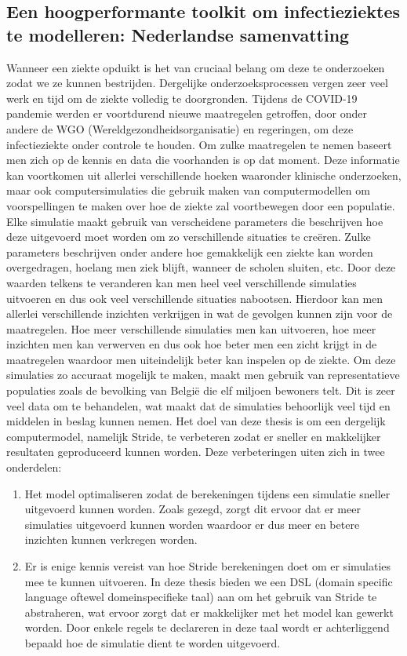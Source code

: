 \begin{appendices}
\chapter{Een hoogperformante toolkit om infectieziektes te modelleren: Nederlandse samenvatting}
Wanneer een ziekte opduikt is het van cruciaal belang om deze te onderzoeken zodat we ze kunnen bestrijden. Dergelijke onderzoeksprocessen vergen zeer veel werk en tijd om de ziekte volledig te doorgronden. Tijdens de COVID-19 pandemie werden er voortdurend nieuwe maatregelen getroffen, door onder andere de WGO (Wereldgezondheidsorganisatie) en regeringen, om deze infectieziekte onder controle te houden. Om zulke maatregelen te nemen baseert men zich op de kennis en data die voorhanden is op dat moment. Deze informatie kan voortkomen uit allerlei verschillende hoeken waaronder klinische onderzoeken, maar ook computersimulaties die gebruik maken van computermodellen om voorspellingen te maken over hoe de ziekte zal voortbewegen door een populatie. Elke simulatie maakt gebruik van verscheidene parameters die beschrijven hoe deze uitgevoerd moet worden om zo verschillende situaties te creëren. Zulke parameters beschrijven onder andere hoe gemakkelijk een ziekte kan worden overgedragen, hoelang men ziek blijft, wanneer de scholen sluiten, etc. Door deze waarden telkens te veranderen kan men heel veel verschillende simulaties uitvoeren en dus ook veel verschillende situaties nabootsen. Hierdoor kan men allerlei verschillende inzichten verkrijgen in wat de gevolgen kunnen zijn voor de maatregelen. Hoe meer verschillende simulaties men kan uitvoeren, hoe meer inzichten men kan verwerven en dus ook hoe beter men een zicht krijgt in de maatregelen waardoor men uiteindelijk beter kan inspelen op de ziekte. Om deze simulaties zo accuraat mogelijk te maken, maakt men gebruik van representatieve populaties zoals de bevolking van België die elf miljoen bewoners telt. Dit is zeer veel data om te behandelen, wat maakt dat de simulaties behoorlijk veel tijd en middelen in beslag kunnen nemen. Het doel van deze thesis is om een dergelijk computermodel, namelijk Stride, te verbeteren zodat er sneller en makkelijker resultaten geproduceerd kunnen worden. Deze verbeteringen uiten zich in twee onderdelen:
\begin{enumerate}
    \item Het model optimaliseren zodat de berekeningen tijdens een simulatie sneller uitgevoerd kunnen worden. Zoals gezegd, zorgt dit ervoor dat er meer simulaties uitgevoerd kunnen worden waardoor er dus meer en betere inzichten kunnen verkregen worden.
    \item Er is enige kennis vereist van hoe Stride berekeningen doet om er simulaties mee te kunnen uitvoeren. In deze thesis bieden we een DSL (domain specific language oftewel domeinspecifieke taal) aan om het gebruik van Stride te abstraheren, wat ervoor zorgt dat er makkelijker met het model kan gewerkt worden. Door enkele regels te declareren in deze taal wordt er achterliggend bepaald hoe de simulatie dient te worden uitgevoerd.
\end{enumerate}


\end{appendices}
